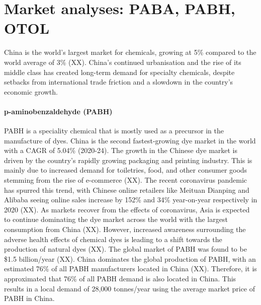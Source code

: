 \section{Market analyses: PABA, PABH, OTOL}
China is the world’s largest market for chemicals, growing at 5\% compared to the world average of 3\% (XX). China’s continued urbanisation and the rise of its middle class has created long-term demand for specialty chemicals, despite setbacks from international trade friction and a slowdown in the country’s economic growth.

\paragraph{p-aminobenzaldehyde (PABH)}
PABH is a speciality chemical that is mostly used as a precursor in the manufacture of dyes. China is the second fastest-growing dye market in the world with a CAGR of 5.04\% (2020-24). The growth in the Chinese dye market is driven by the country’s rapidly growing packaging and printing industry. This is mainly due to increased demand for toiletries, food, and other consumer goods stemming from the rise of e-commerce (XX). The recent coronavirus pandemic has spurred this trend, with Chinese online retailers like Meituan Dianping and Alibaba seeing online sales increase by 152\% and 34\% year-on-year respectively in 2020 (XX). As markets recover from the effects of coronavirus, Asia is expected to continue dominating the dye market across the world with the largest consumption from China (XX). However, increased awareness surrounding the adverse health effects of chemical dyes is leading to a shift towards the production of natural dyes (XX). The global market of PABH was found to be \$1.5 billion/year (XX). China dominates the global production of PABH, with an estimated 76\% of all PABH manufacturers located in China (XX). Therefore, it is approximated that 76\% of all PABH demand is also located in China. This results in a local demand of 28,000 tonnes/year using the average market price of PABH in China.


